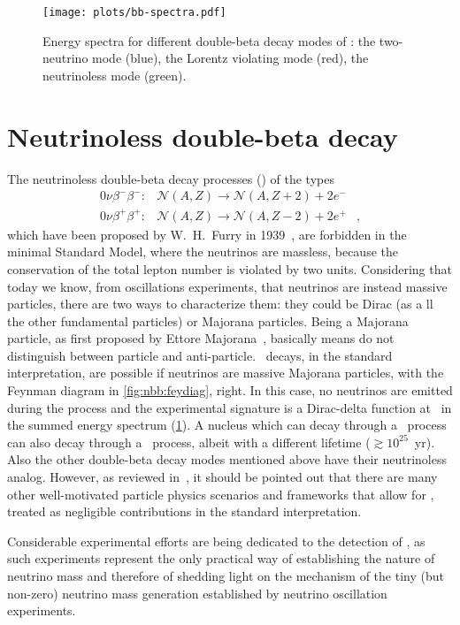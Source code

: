 \begin{figure}
  \centering
  \texttt{[image: plots/bb-spectra.pdf]}
  \caption{%
    Energy spectra for different double-beta decay modes of \gesix: the
    two-neutrino mode (blue), the Lorentz violating mode (red), the
    neutrinoless mode (green).
  }\label{fig:nbb:spectra}
\end{figure}

\section{Neutrinoless double-beta decay}\label{sec:nbb:0nbb}

The neutrinoless double-beta decay processes (\onbb) of the types
\[
  \begin{array}{lrl}
    0\nu\beta^-\beta^-: &
      \mathcal{N}(A,Z) \longrightarrow \mathcal{N}(A,Z+2)+2e^- & \\
    0\nu\beta^+\beta^+: &
      \mathcal{N}(A,Z) \longrightarrow \mathcal{N}(A,Z-2)+2e^+ &,
  \end{array}
\]
which have been proposed by W.~H.~Furry in 1939~\cite{Furry1939}, are
forbidden in the minimal Standard Model, where the neutrinos are massless,
because the conservation of the total lepton number is violated by two units.
Considering that today we know, from oscillations experiments, that neutrinos
are instead massive particles, there are two ways to characterize them: they
could be Dirac (as a ll the other fundamental particles) or Majorana particles.
Being a Majorana particle, as first proposed by Ettore
Majorana~\cite{Majorana1932}, basically means do not distinguish between
particle and anti-particle. \onbb\ decays, in the standard interpretation, are
possible if neutrinos are massive Majorana particles, with the Feynman diagram
in \cref{fig:nbb:feydiag}, right. In this case, no neutrinos are emitted during
the process and the experimental signature is a Dirac-delta function at \qbb\
in the summed energy spectrum (\cref{fig:nbb:spectra}).  A nucleus which can
decay through a \nnbb\ process can also decay through a \onbb\ process, albeit
with a different lifetime ($\gtrsim 10^{25}$~yr). Also the other double-beta
decay modes mentioned above have their neutrinoless analog. However, as
reviewed in~\cite{Rodejohann2011}, it should be pointed out that there are many
other well-motivated particle physics scenarios and frameworks that allow for
\onbb, treated as negligible contributions in the standard interpretation.

Considerable experimental efforts are being dedicated to the detection of
\onbb, as such experiments represent the only practical way of establishing
the nature of neutrino mass and therefore of shedding light on the mechanism of
the tiny (but non-zero) neutrino mass generation established by neutrino
oscillation experiments.

